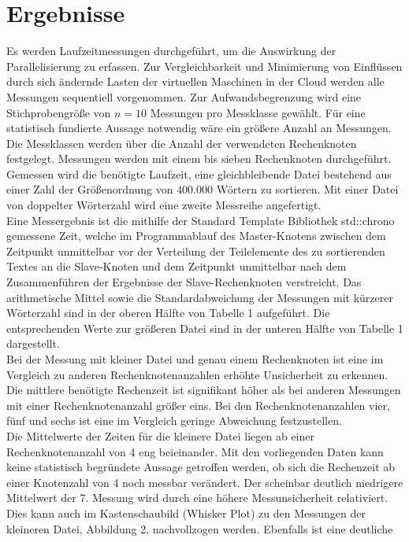 \section{Ergebnisse}
Es werden Laufzeitmessungen durchgeführt, um die Auswirkung der Parallelisierung zu erfassen. Zur Vergleichbarkeit und Minimierung von Einflüssen durch sich ändernde Lasten der virtuellen Maschinen in der Cloud werden alle Messungen sequentiell vorgenommen. Zur Aufwandsbegrenzung wird eine Stichprobengröße von $n = 10$ Messungen pro Messklasse gewählt. Für eine statistisch fundierte Aussage notwendig wäre ein größere Anzahl an Messungen. Die Messklassen werden über die Anzahl der verwendeten Rechenknoten festgelegt. Messungen werden mit einem bis sieben Rechenknoten durchgeführt. Gemessen wird die benötigte Laufzeit, eine gleichbleibende Datei bestehend aus einer Zahl der Größenordnung von $400.000$ Wörtern zu sortieren. Mit einer Datei von doppelter Wörterzahl wird eine zweite Messreihe angefertigt.
\\
Eine Messergebnis ist die mithilfe der Standard Template Bibliothek std::chrono gemessene Zeit, welche im Programmablauf des Master-Knotens zwischen dem Zeitpunkt unmittelbar vor der Verteilung der Teilelemente 
des zu sortierenden Textes an die Slave-Knoten und dem Zeitpunkt unmittelbar nach dem Zusammenführen der Ergebnisse der Slave-Rechenknoten verstreicht.
Das arithmetische Mittel sowie die Standardabweichung der Messungen mit kürzerer Wörterzahl sind in der oberen Hälfte von Tabelle 1 aufgeführt. Die entsprechenden Werte zur größeren Datei sind in der unteren Hälfte von Tabelle 1 dargestellt.
\\
Bei der Messung mit kleiner Datei und genau einem Rechenknoten ist eine im Vergleich zu anderen Rechenknotenanzahlen erhöhte Unsicherheit zu erkennen. Die mittlere benötigte Rechenzeit ist signifikant höher als bei anderen Messungen mit einer Rechenknotenanzahl größer eins. Bei den Rechenknotenanzahlen vier, fünf und sechs ist eine im Vergleich geringe Abweichung festzustellen.
\\
Die Mittelwerte der Zeiten für die kleinere Datei liegen ab einer Rechenknotenanzahl von 4 eng beieinander. Mit den vorliegenden Daten kann keine statistisch begründete Aussage getroffen werden, ob sich die Rechenzeit ab einer Knotenzahl von 4 noch messbar verändert. Der scheinbar deutlich niedrigere Mittelwert der 7. Messung wird durch eine höhere Messunsicherheit relativiert.
\\
Dies kann auch im Kastenschaubild (Whisker Plot) zu den Messungen der kleineren Datei, Abbildung 2, nachvollzogen werden. Ebenfalls ist eine deutliche 

